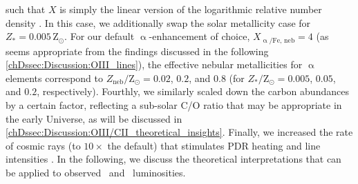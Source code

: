 \noindent such that $X$ is simply the linear version of the logarithmic relative number density . In this case, we additionally swap the solar metallicity case for $Z_* = 0.005 \, \mathrm{Z_\odot}$. For our default $\upalpha$-enhancement of choice, $X_\mathrm{\upalpha/Fe, \, neb} = 4$ (as seems appropriate from the findings discussed in the following \cref{chDssec:Discussion:OIII_lines}), the effective nebular metallicities for $\upalpha$ elements correspond to $Z_\text{neb}/\mathrm{Z_\odot} = 0.02$, $0.2$, and $0.8$ (for $Z_*/\mathrm{Z_\odot} = 0.005$, $0.05$, and $0.2$, respectively). Fourthly, we similarly scaled down the carbon abundances by a certain factor, reflecting a sub-solar C/O ratio that may be appropriate in the early Universe, as will be discussed in \cref{chDssec:Discussion:OIII/CII_theoretical_insights}. Finally, we increased the rate of cosmic rays (to $10 \times$ the  default) that stimulates PDR heating and line intensities \citep[notably that of \CIILam; e.g.][]{2019A&A...626A..23C}. In the following, we discuss the theoretical interpretations that can be applied to observed \OIIILam\ and \CIILam\ luminosities.
